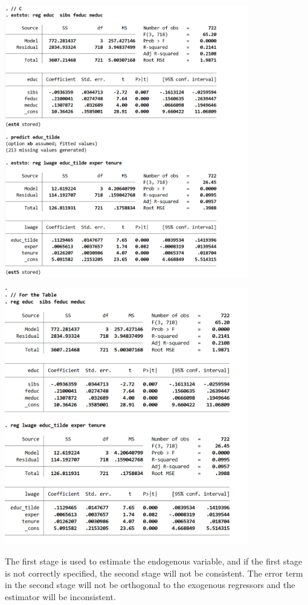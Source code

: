 \documentclass[12pt, oneside]{article}
\begin{document}
\begin{center}


    \includegraphics[width=0.8\textwidth]{Figure/P3.5.jpg}

    \includegraphics[width=0.8\textwidth]{Figure/P3.6.jpg}
\end{center}

The first stage is used to estimate the endogenous variable, and if the first stage is not correctly specified, the second stage will not be consistent. The error term in the second stage will not be orthogonal to the exogenous regressors and the estimator will be inconsistent. 
\end{document}
